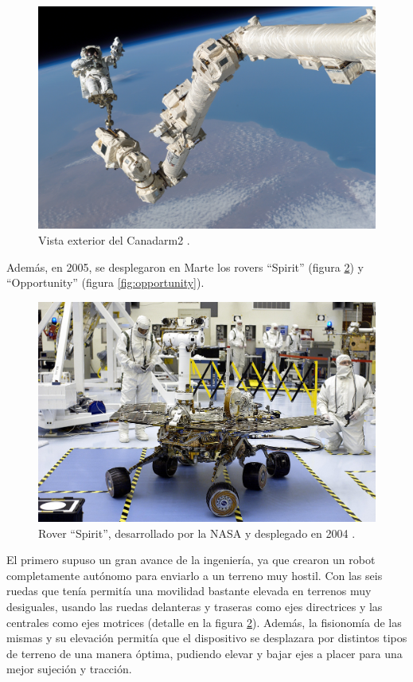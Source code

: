 \begin{figure}[H]
    \centering
    \includegraphics[width=.63\linewidth]{pictures/STS-114_Steve_Robinson_on_Canadarm2.jpg}
    \caption{Vista exterior del Canadarm2 \cite{MobileServicingSystem2020a}.}
    \label{fig:canadarm2}
\end{figure}

Además, en 2005, se desplegaron en Marte los rovers ``Spirit'' (figura \ref{fig:spirit}) y 
``Opportunity'' (figura \ref{fig:opportunity}). 

\begin{figure}
    \centering
    \includegraphics[width=.75\linewidth]{pictures/spirit_rover.jpg}
    \caption{Rover ``Spirit'', desarrollado por la NASA y desplegado en 2004 \cite{SpiritRover2020a}.}
    \label{fig:spirit}
\end{figure}

El primero supuso un gran avance de la
ingeniería, ya que crearon un robot completamente autónomo para enviarlo a un terreno
muy hostil. Con las seis ruedas que tenía permitía una movilidad bastante elevada en
terrenos muy desiguales, usando las ruedas delanteras y traseras como ejes directrices 
y las centrales como ejes motrices (detalle en la figura \ref{fig:spirit}). Además,
la fisionomía de las mismas y su elevación permitía que el dispositivo se desplazara por
distintos tipos de terreno de una manera óptima, pudiendo elevar y bajar ejes a placer
para una mejor sujeción y tracción.

